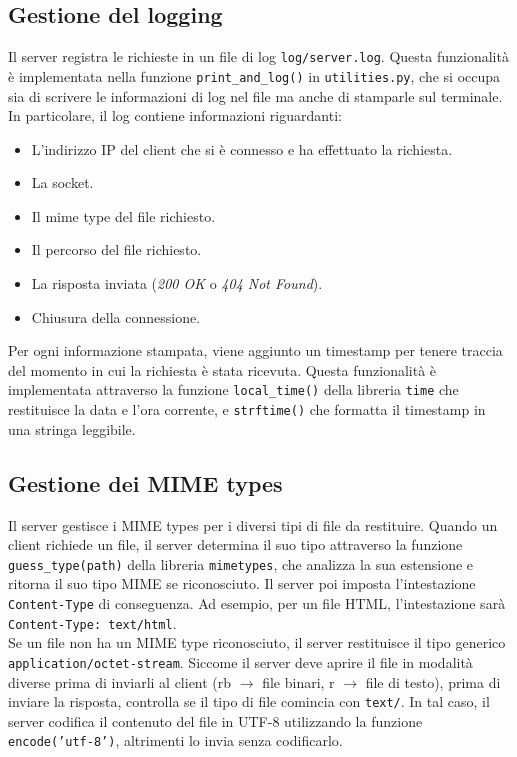 \documentclass[a4paper,12pt]{report}
\begin{document}
\subsection{Gestione del logging}
\label{sec:gestione-logging}
Il server registra le richieste in un file di log \texttt{log/server.log}. Questa funzionalità è implementata nella funzione \texttt{print\_and\_log()} in \texttt{utilities.py}, che si occupa sia di scrivere le informazioni di log nel file ma anche di stamparle sul terminale.
In particolare, il log contiene informazioni riguardanti:
\begin{itemize}
    \item L'indirizzo IP del client che si è connesso e ha effettuato la richiesta.
    \item La socket.
    \item Il mime type del file richiesto.
    \item Il percorso del file richiesto.
    \item La risposta inviata (\textit{200 OK} o \textit{404 Not Found}).
    \item Chiusura della connessione.
\end{itemize}
Per ogni informazione stampata, viene aggiunto un timestamp per tenere traccia del momento in cui la richiesta è stata ricevuta. Questa funzionalità è implementata attraverso la funzione \texttt{local\_time()} della libreria \texttt{time} che restituisce la data e l'ora corrente, e \texttt{strftime()} che formatta il timestamp in una stringa leggibile.

\subsection{Gestione dei MIME types}
\label{sec:mime-types}
Il server gestisce i MIME types per i diversi tipi di file da restituire. Quando un client richiede un file, il server determina il suo tipo attraverso la funzione \texttt{guess\_type(path)} della libreria \texttt{mimetypes}, che analizza la sua estensione e ritorna il suo tipo MIME se riconosciuto. Il server poi imposta l'intestazione \texttt{Content-Type} di conseguenza. Ad esempio, per un file HTML, l'intestazione sarà \texttt{Content-Type: text/html}. \\ Se un file non ha un MIME type riconosciuto, il server restituisce il tipo generico \texttt{application/octet-stream}.
Siccome il server deve aprire il file in modalità diverse prima di inviarli al client (rb $\rightarrow$ file binari, r $\rightarrow$ file di testo), prima di inviare la risposta, controlla se il tipo di file comincia con \texttt{text/}. In tal caso, il server codifica il contenuto del file in UTF-8 utilizzando la funzione \texttt{encode('utf-8')}, altrimenti lo invia senza codificarlo.
\end{document}
